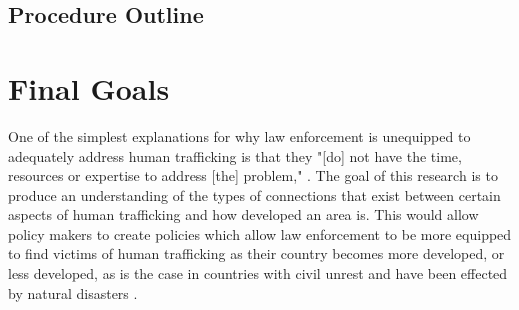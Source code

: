 \documentclass{article} %
\begin{document}
\subsection{Procedure Outline}

\section{Final Goals}

One of the simplest explanations for why law enforcement is unequipped to adequately address human trafficking is that they "[do] not have the time,
resources or expertise to address [the] problem," \parencite{LawResponse}. The goal of this research is to produce an understanding of the types of connections that exist between certain aspects of human trafficking and how developed an area is. This would allow policy makers to create policies which allow law enforcement to be more equipped to find victims of human trafficking as their country becomes more developed, or less developed, as is the case in countries with civil unrest and have been effected by natural disasters \parencite{bar2010}.


\printbibliography
\end{document}
